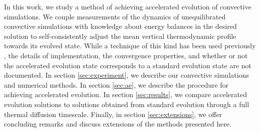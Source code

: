 \documentclass[aps, pre, onecolumn, nofootinbib, notitlepage, groupedaddress, amsfonts, amssymb, amsmath, longbibliography]{revtex4-1}
\begin{document}
In this work, we study a method of achieving accelerated evolution of
convective simulations. We couple measurements of the dynamics of unequilibrated
convective simulations with knowledge about energy balances in the desired solution
to self-consistently adjust the mean vertical thermodynamic profile towards its evolved state. 
While a technique of this kind has been used previously \cite{hurlburt&all1986},
the details of implementation, the convergence properties, and whether or not the
accelerated evolution state corresponds to a standard evolution state are not documented.
In section \ref{sec:experiment}, we describe our convective simulations and
numerical methods. In section \ref{sec:ae}, we describe the procedure for 
achieving accelerated evolution. In
section \ref{sec:results}, we compare accelerated evolution solutions
to solutions obtained from standard evolution through a full thermal diffusion timescale. Finally,
in section \ref{sec:extensions}, we offer concluding remarks and
discuss extensions of the methods presented here.


\end{document}
